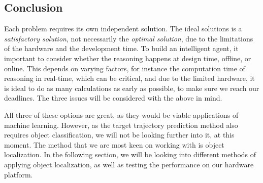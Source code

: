 \subsection{Conclusion}\label{Design:MI:sub:conclusion}
Each problem requires its own independent solution.
The ideal solutions is a \textit{satisfactory solution}, not necessarily the \textit{optimal solution}, due to the limitations of the hardware and the development time.
To build an intelligent agent, it important to consider whether the reasoning happens at design time, offline, or online.
This depends on varying factors, for instance the computation time of reasoning in real-time, which can be critical, and due to the limited hardware, it is ideal to do as many calculations as early as possible, to make sure we reach our deadlines.
The three issues will be considered with the above in mind.

All three of these options are great, as they would be viable applications of machine learning.
However, as the target trajectory prediction method also requires object classification, we will not be looking further into it, at this moment.
The method that we are most keen on working with is object localization.
In the following section, we will be looking into different methods of applying object localization, as well as testing the performance on our hardware platform.
